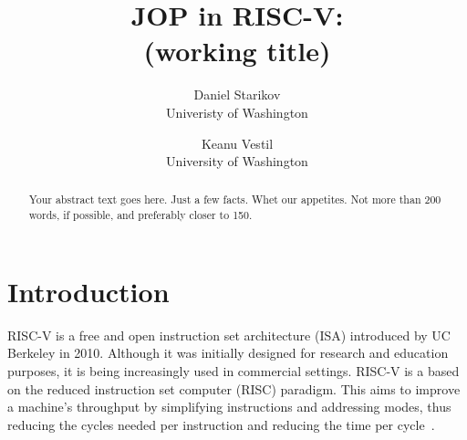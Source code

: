 

\date{}

\title{\Large \bf JOP in RISC-V:\\
  (working title)}

\author{
{\rm Daniel Starikov}\\
Univeristy of Washington
\and
{\rm Keanu Vestil}\\
University of Washington
} %

\maketitle

\begin{abstract}
Your abstract text goes here. Just a few facts. Whet our appetites.
Not more than 200 words, if possible, and preferably closer to 150.
\end{abstract}


\section{Introduction}

RISC-V is a free and open instruction set architecture (ISA) introduced by UC
Berkeley in 2010. Although it was initially designed for research and education
purposes, it is being increasingly used in commercial settings. RISC-V is a
based on the reduced instruction set computer (RISC) paradigm. This aims to
improve a machine's throughput by simplifying instructions and addressing modes,
thus reducing the cycles needed per instruction and reducing the time per cycle~\cite{patterson98risc}.


